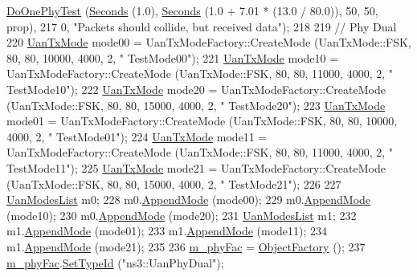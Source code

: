 \begin{DoxyCode}
      \hyperlink{classUanTest_a006331b086a052683abed216dc67dd8d}{DoOnePhyTest} (\hyperlink{group__timecivil_ga33c34b816f8ff6628e33d5c8e9713b9e}{Seconds} (1.0), \hyperlink{group__timecivil_ga33c34b816f8ff6628e33d5c8e9713b9e}{Seconds} (1.0 + 7.01 * (13.0 / 80.0)), 50, 50, prop),
217                                       0, \textcolor{stringliteral}{"Packets should collide, but received data"});
218 
219   \textcolor{comment}{// Phy Dual}
220   \hyperlink{classns3_1_1UanTxMode}{UanTxMode} mode00 = UanTxModeFactory::CreateMode (UanTxMode::FSK, 80, 80, 10000, 4000, 2, \textcolor{stringliteral}{"
      TestMode00"});
221   \hyperlink{classns3_1_1UanTxMode}{UanTxMode} mode10 = UanTxModeFactory::CreateMode (UanTxMode::FSK, 80, 80, 11000, 4000, 2, \textcolor{stringliteral}{"
      TestMode10"});
222   \hyperlink{classns3_1_1UanTxMode}{UanTxMode} mode20 = UanTxModeFactory::CreateMode (UanTxMode::FSK, 80, 80, 15000, 4000, 2, \textcolor{stringliteral}{"
      TestMode20"});
223   \hyperlink{classns3_1_1UanTxMode}{UanTxMode} mode01 = UanTxModeFactory::CreateMode (UanTxMode::FSK, 80, 80, 10000, 4000, 2, \textcolor{stringliteral}{"
      TestMode01"});
224   \hyperlink{classns3_1_1UanTxMode}{UanTxMode} mode11 = UanTxModeFactory::CreateMode (UanTxMode::FSK, 80, 80, 11000, 4000, 2, \textcolor{stringliteral}{"
      TestMode11"});
225   \hyperlink{classns3_1_1UanTxMode}{UanTxMode} mode21 = UanTxModeFactory::CreateMode (UanTxMode::FSK, 80, 80, 15000, 4000, 2, \textcolor{stringliteral}{"
      TestMode21"});
226 
227   \hyperlink{classns3_1_1UanModesList}{UanModesList} m0;
228   m0.\hyperlink{classns3_1_1UanModesList_ae47998ab8ad053aecd5f2849043ec403}{AppendMode} (mode00);
229   m0.\hyperlink{classns3_1_1UanModesList_ae47998ab8ad053aecd5f2849043ec403}{AppendMode} (mode10);
230   m0.\hyperlink{classns3_1_1UanModesList_ae47998ab8ad053aecd5f2849043ec403}{AppendMode} (mode20);
231   \hyperlink{classns3_1_1UanModesList}{UanModesList} m1;
232   m1.\hyperlink{classns3_1_1UanModesList_ae47998ab8ad053aecd5f2849043ec403}{AppendMode} (mode01);
233   m1.\hyperlink{classns3_1_1UanModesList_ae47998ab8ad053aecd5f2849043ec403}{AppendMode} (mode11);
234   m1.\hyperlink{classns3_1_1UanModesList_ae47998ab8ad053aecd5f2849043ec403}{AppendMode} (mode21);
235 
236   \hyperlink{classUanTest_aa3af462909130b54c4b43b5bca42446b}{m\_phyFac} = \hyperlink{classns3_1_1ObjectFactory}{ObjectFactory} ();
237   \hyperlink{classUanTest_aa3af462909130b54c4b43b5bca42446b}{m\_phyFac}.\hyperlink{classns3_1_1ObjectFactory_a77dcd099064038a1eb7a6b8251229ec3}{SetTypeId} (\textcolor{stringliteral}{"ns3::UanPhyDual"});

\end{DoxyCode}
